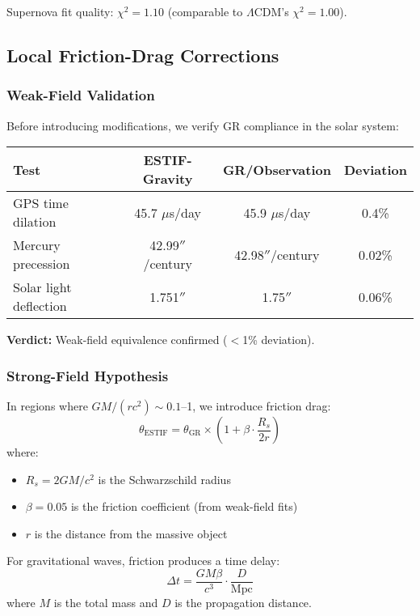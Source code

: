 \documentclass[12pt]{article}
\begin{document}
Supernova fit quality: $\chi^2 = 1.10$ (comparable to $\Lambda$CDM's $\chi^2 = 1.00$).

\subsection{Local Friction-Drag Corrections}

\subsubsection{Weak-Field Validation}

Before introducing modifications, we verify GR compliance in the solar system:

\begin{center}
\begin{tabular}{lccc}
\hline
Test & ESTIF-Gravity & GR/Observation & Deviation \\
\hline
GPS time dilation & 45.7 $\mu$s/day & 45.9 $\mu$s/day & 0.4\% \\
Mercury precession & 42.99$''$/century & 42.98$''$/century & 0.02\% \\
Solar light deflection & 1.751$''$ & 1.75$''$ & 0.06\% \\
\hline
\end{tabular}
\end{center}

\textbf{Verdict:} Weak-field equivalence confirmed ($<$1\% deviation).

\subsubsection{Strong-Field Hypothesis}

In regions where $GM/(rc^2) \sim 0.1$--1, we introduce friction drag:
\begin{equation}
\theta_{\text{ESTIF}} = \theta_{\text{GR}} \times \left(1 + \beta \cdot \frac{R_s}{2r}\right)
\label{eq:lensing}
\end{equation}
where:
\begin{itemize}
    \item $R_s = 2GM/c^2$ is the Schwarzschild radius
    \item $\beta = 0.05$ is the friction coefficient (from weak-field fits)
    \item $r$ is the distance from the massive object
\end{itemize}

For gravitational waves, friction produces a time delay:
\begin{equation}
\Delta t = \frac{GM\beta}{c^3} \cdot \frac{D}{\text{Mpc}}
\label{eq:gw_delay}
\end{equation}
where $M$ is the total mass and $D$ is the propagation distance.
\end{document}
